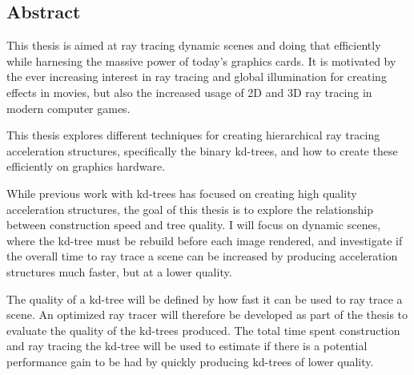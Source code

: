

\begin{center}
\begin{minipage}{0.7\textwidth}
\section*{Abstract}

This thesis is aimed at ray tracing dynamic scenes and doing that efficiently
while harnesing the massive power of today's graphics cards. It is motivated by
the ever increasing interest in ray tracing and global illumination for creating
effects in movies, but also the increased usage of 2D and 3D ray tracing in
modern computer games.

This thesis explores different techniques for creating hierarchical ray tracing
acceleration structures, specifically the binary kd-trees, and how to create
these efficiently on graphics hardware.

While previous work with kd-trees has focused on creating high quality
acceleration structures, the goal of this thesis is to explore the relationship
between construction speed and tree quality. I will focus on dynamic scenes,
where the kd-tree must be rebuild before each image rendered, and investigate if
the overall time to ray trace a scene can be increased by producing acceleration
structures much faster, but at a lower quality.

The quality of a kd-tree will be defined by how fast it can be used to ray trace
a scene. An optimized ray tracer will therefore be developed as part of the
thesis to evaluate the quality of the kd-trees produced. The total time spent
construction and ray tracing the kd-tree will be used to estimate if there is a
potential performance gain to be had by quickly producing kd-trees of lower
quality.

\end{minipage}
\end{center}


